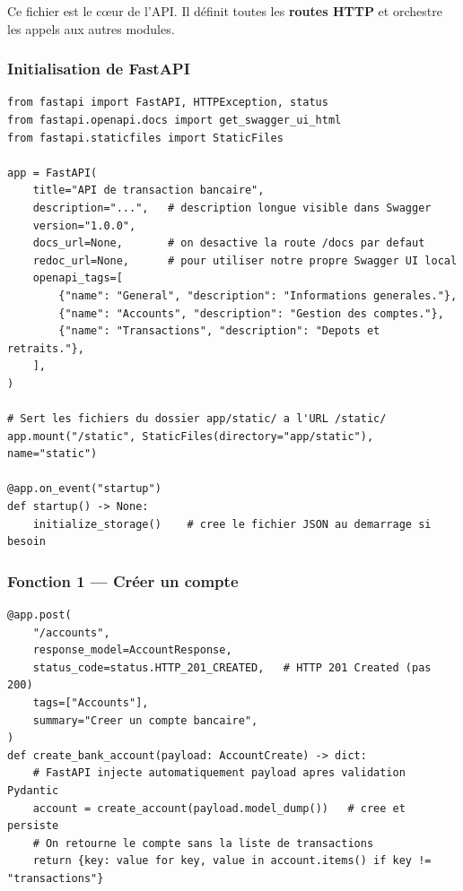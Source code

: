 \documentclass[12pt,a4paper]{article}
\begin{document}
Ce fichier est le cœur de l'API. Il définit toutes les \textbf{routes HTTP} et orchestre les appels aux autres modules.

\subsubsection{Initialisation de FastAPI}

\begin{lstlisting}[style=python, caption={main.py — Initialisation de l'application}]
from fastapi import FastAPI, HTTPException, status
from fastapi.openapi.docs import get_swagger_ui_html
from fastapi.staticfiles import StaticFiles

app = FastAPI(
    title="API de transaction bancaire",
    description="...",   # description longue visible dans Swagger
    version="1.0.0",
    docs_url=None,       # on desactive la route /docs par defaut
    redoc_url=None,      # pour utiliser notre propre Swagger UI local
    openapi_tags=[
        {"name": "General", "description": "Informations generales."},
        {"name": "Accounts", "description": "Gestion des comptes."},
        {"name": "Transactions", "description": "Depots et retraits."},
    ],
)

# Sert les fichiers du dossier app/static/ a l'URL /static/
app.mount("/static", StaticFiles(directory="app/static"), name="static")

@app.on_event("startup")
def startup() -> None:
    initialize_storage()    # cree le fichier JSON au demarrage si besoin
\end{lstlisting}

\subsubsection{Fonction 1 — Créer un compte}

\begin{lstlisting}[style=python, caption={main.py — POST /accounts}]
@app.post(
    "/accounts",
    response_model=AccountResponse,
    status_code=status.HTTP_201_CREATED,   # HTTP 201 Created (pas 200)
    tags=["Accounts"],
    summary="Creer un compte bancaire",
)
def create_bank_account(payload: AccountCreate) -> dict:
    # FastAPI injecte automatiquement payload apres validation Pydantic
    account = create_account(payload.model_dump())   # cree et persiste
    # On retourne le compte sans la liste de transactions
    return {key: value for key, value in account.items() if key != "transactions"}
\end{lstlisting}
\end{document}
